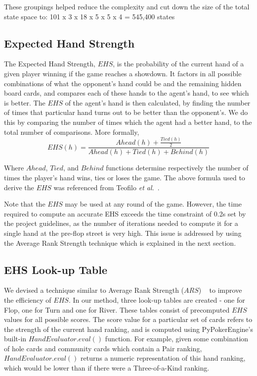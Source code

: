 \documentclass{article}
\begin{document}
These groupings helped reduce the complexity and cut down the size of the total state space to: 101 x 3 x 18 x 5 x 5 x 4 = 545,400 states


\subsection{Expected Hand Strength}

The Expected Hand Strength, $EHS$, is the probability of the current hand of a given player winning if the game reaches a showdown. It factors in all possible combinations of what the opponent's hand could be and the remaining hidden board cards, and compares each of these hands to the agent's hand, to see which is better. The $EHS$ of the agent's hand is then calculated, by finding the number of times that particular hand turns out to be better than the opponent's. We do this by comparing the number of times which the agent had a better hand, to the total number of comparisons. More formally,
\begin{displaymath}
  EHS(h)= \frac{Ahead(h)+\frac{Tied(h)}{2}}{Ahead(h) + Tied(h) + Behind(h)}
\end{displaymath}

\noindent Where $Ahead$, $Tied$, and $Behind$ functions determine respectively the number of times the player's hand wins, ties or loses the game. The above formula used to derive the $EHS$ was referenced from Teofilo \textit{et al.}~. 

Note that the $EHS$ may be used at any round of the game. However, the time required to compute an accurate EHS exceeds the time constraint of 0.2s set by the project guidelines, as the number of iterations needed to compute it for a single hand at the pre-flop street is very high. This issue is addressed by using the Average Rank Strength technique which is explained in the next section.

\subsection{EHS Look-up Table}

We devised a technique similar to Average Rank Strength ($ARS$) ~\cite{trc:ars} to improve the efficiency of $EHS$. In our method, three look-up tables are created - one for Flop, one for Turn and one for River. These tables consist of precomputed $EHS$ values for all possible scores. The score value for a particular set of cards refers to the strength of the current hand ranking, and is computed using PyPokerEngine's built-in $HandEvaluator.eval()$ function. For example, given some combination of hole cards and community cards which contain a Pair ranking, $HandEvaluator.eval()$ returns a numeric representation of this hand ranking, which would be lower than if there were a Three-of-a-Kind ranking. 
\end{document}

